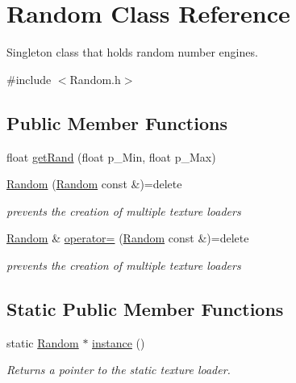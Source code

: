 \hypertarget{class_random}{}\section{Random Class Reference}
\label{class_random}


Singleton class that holds random number engines.  




{\ttfamily \#include $<$Random.\+h$>$}

\subsection*{Public Member Functions}
\begin{DoxyCompactItemize}
\item 
float \hyperlink{class_random_a00363b48c0e54b490a11957a40200bad}{get\+Rand} (float p\+\_\+\+Min, float p\+\_\+\+Max)
\item 
\mbox{\label{class_random_a649b59f8ec026bdc1ec5aab2d8d5f98e}} 
\hyperlink{class_random_a649b59f8ec026bdc1ec5aab2d8d5f98e}{Random} (\hyperlink{class_random}{Random} const \&)=delete
\begin{DoxyCompactList}\small\item\em prevents the creation of multiple texture loaders \end{DoxyCompactList}\item 
\mbox{\label{class_random_a1ba4b35433055f747ac97d847d39d7a4}} 
\hyperlink{class_random}{Random} \& \hyperlink{class_random_a1ba4b35433055f747ac97d847d39d7a4}{operator=} (\hyperlink{class_random}{Random} const \&)=delete
\begin{DoxyCompactList}\small\item\em prevents the creation of multiple texture loaders \end{DoxyCompactList}\end{DoxyCompactItemize}
\subsection*{Static Public Member Functions}
\begin{DoxyCompactItemize}
\item 
\mbox{\label{class_random_a562d087178f9a4d17c5c034561774797}} 
static \hyperlink{class_random}{Random} $\ast$ \hyperlink{class_random_a562d087178f9a4d17c5c034561774797}{instance} ()
\begin{DoxyCompactList}\small\item\em Returns a pointer to the static texture loader. \end{DoxyCompactList}\end{DoxyCompactItemize}


